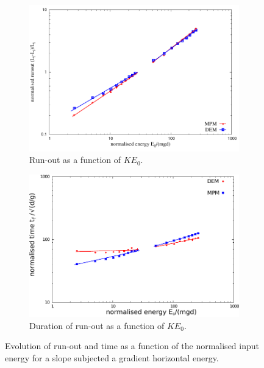 \documentclass[3p,times,procedia,number]{elsarticle}
\begin{document}
\begin{figure}[tbph]
  \centering
  \begin{subfigure}[b]{0.49\textwidth}
    \centering
    \includegraphics[width=\textwidth]{figs/runout_eo_mpm_dem}
    \caption{Run-out as a function of $KE_0$.}
    \label{fig:runout_eo_mpm_dem}
  \end{subfigure}
  \begin{subfigure}[b]{0.49\textwidth}
    \centering
    \includegraphics[width=\textwidth]{figs/Tf_vs_Eo_Slope}
    \caption{Duration of run-out as a function of $KE_0$.}
    \label{fig:Tf_vs_Eo_Slope}
  \end{subfigure}
  \caption{Evolution of run-out and time as a function of the normalised input 
  energy for a slope subjected a gradient horizontal energy.}
  \label{fig:Slope}
\end{figure}
\end{document}
